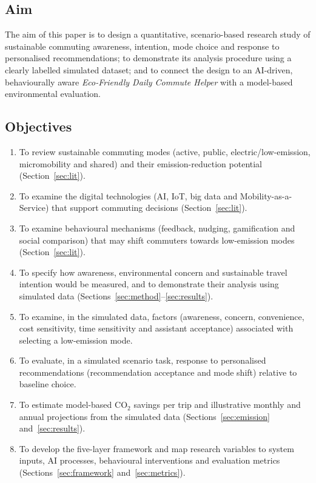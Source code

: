 \documentclass[11pt,a4paper]{article}
\begin{document}
\subsection{Aim}
The aim of this paper is to design a quantitative, scenario-based research study of sustainable
commuting awareness, intention, mode choice and response to personalised recommendations; to
demonstrate its analysis procedure using a clearly labelled simulated dataset; and to connect the
design to an AI-driven, behaviourally aware \emph{Eco-Friendly Daily Commute Helper} with a
model-based environmental evaluation.

\subsection{Objectives}
\begin{enumerate}[label=O\arabic*.,leftmargin=*]
\item To review sustainable commuting modes (active, public, electric/low-emission, micromobility and
shared) and their emission-reduction potential (Section~\ref{sec:lit}).
\item To examine the digital technologies (AI, IoT, big data and Mobility-as-a-Service) that support
commuting decisions (Section~\ref{sec:lit}).
\item To examine behavioural mechanisms (feedback, nudging, gamification and social comparison) that
may shift commuters towards low-emission modes (Section~\ref{sec:lit}).
\item To specify how awareness, environmental concern and sustainable travel intention would be
measured, and to demonstrate their analysis using simulated data (Sections~\ref{sec:method}--\ref{sec:results}).
\item To examine, in the simulated data, factors (awareness, concern, convenience, cost sensitivity,
time sensitivity and assistant acceptance) associated with selecting a low-emission mode.
\item To evaluate, in a simulated scenario task, response to personalised recommendations
(recommendation acceptance and mode shift) relative to baseline choice.
\item To estimate model-based CO$_2$ savings per trip and illustrative monthly and annual projections
from the simulated data (Sections~\ref{sec:emission} and~\ref{sec:results}).
\item To develop the five-layer framework and map research variables to system inputs, AI processes,
behavioural interventions and evaluation metrics (Sections~\ref{sec:framework} and~\ref{sec:metrics}).
\end{enumerate}
\end{document}
